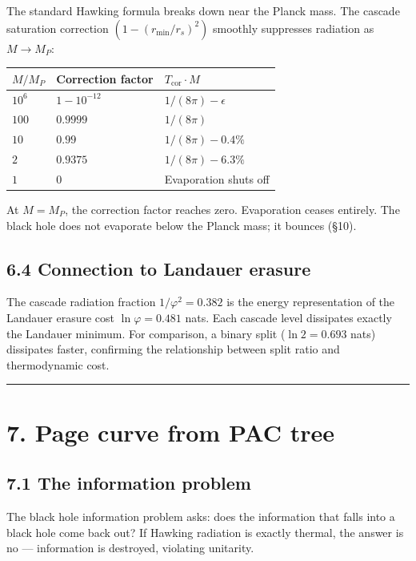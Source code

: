 \documentclass[11pt,a4paper]{article}
\begin{document}
The standard Hawking formula breaks down near the Planck mass. The cascade saturation correction $(1 - (r_{\text{min}}/r_s)^2)$ smoothly suppresses radiation as $M \to M_P$:

\begin{longtable}[]{@{}lll@{}}
\toprule
$M / M_P$ & Correction factor & $T_{\text{cor}} \cdot M$ \\
\midrule\endhead
$10^6$ & $1 - 10^{-12}$ & $1/(8\pi) - \epsilon$ \\
$100$ & $0.9999$ & $1/(8\pi)$ \\
$10$ & $0.99$ & $1/(8\pi) - 0.4\%$ \\
$2$ & $0.9375$ & $1/(8\pi) - 6.3\%$ \\
$1$ & $0$ & Evaporation shuts off \\
\bottomrule
\end{longtable}

At $M = M_P$, the correction factor reaches zero. Evaporation ceases entirely. The black hole does not evaporate below the Planck mass; it bounces (§10).

\subsection*{6.4 Connection to Landauer erasure}

The cascade radiation fraction $1/\varphi^2 = 0.382$ is the energy representation of the Landauer erasure cost $\ln\varphi = 0.481$ nats. Each cascade level dissipates exactly the Landauer minimum. For comparison, a binary split ($\ln 2 = 0.693$ nats) dissipates faster, confirming the relationship between split ratio and thermodynamic cost.

\begin{center}\rule{0.5\linewidth}{0.4pt}\end{center}

\section*{7. Page curve from PAC tree}

\subsection*{7.1 The information problem}

The black hole information problem asks: does the information that falls into a black hole come back out? If Hawking radiation is exactly thermal, the answer is no — information is destroyed, violating unitarity.
\end{document}
